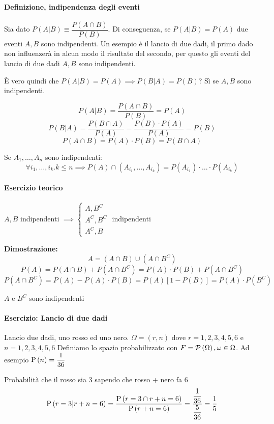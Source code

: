 \paragraph{Definizione, indipendenza degli eventi} 

Sia dato $ P(A|B) \equiv \dfrac{P(A \cap B)}{P(B)} $. Di conseguenza, se $ P(A|B) = P(A) $ due eventi $ A,B $ sono indipendenti. Un esempio è il lancio di due dadi, il primo dado non influenzerà in alcun modo il risultato del secondo, per questo gli eventi del lancio di due dadi $ A,B $ sono indipendenti.

È vero quindi che $ P(A|B) = P(A) \implies P(B|A) = P(B) $? Sì se $ A,B $ sono indipendenti.

\[ P(A|B) = \dfrac{P(A \cap B)}{P(B)} = P(A) \]
\[ P(B|A) = \dfrac{P(B \cap A)}{P(A)} = \dfrac{P(B) \cdot P(A)}{P(A)} = P(B)\]
\[ P(A \cap B)  = P(A) \cdot P(B) = P(B \cap A) \]

Se $ A_1, \dots, A_n $ sono indipendenti:
\[ \forall i_1, \dots, i_k . k \leq n  \implies P(A)\cap \left(A_{i_1},\dots,A_{i_k}\right) = P(A_{i_1}) \cdot \dots \cdot P(A_{i_k}) \] 

\paragraph{Esercizio teorico}

$ A, B $ indipendenti $ \implies \begin{cases}
A, B^C \\
A^C, B^C \\
A^C, B
\end{cases} $ indipendenti

\textbf{Dimostrazione:}
\[ A = (A \cap B) \cup (A \cap B^C)  \]
\[ P(A) = P(A \cap B) + P(A \cap B^C) = P(A) \cdot P(B) + P(A \cap B^C) \]
\[ P(A \cap B^C) = P(A) - P(A) \cdot P(B) = P(A)\left[1 - P(B)\right] = P(A) \cdot P(B^C) \]

$ A $ e $ B^C $ sono indipendenti \enddim

\paragraph{Esercizio: Lancio di due dadi}
Lancio due dadi, uno rosso ed uno nero.
$ \Omega = (r, n) $ dove $ r = 1,2,3,4,5,6 $ e $ n = 1,2,3,4,5,6 $ 
Definiamo lo spazio probabilizzato con $ F = \mathcal{P}\left(\Omega\right), \omega \in \Omega $. Ad esempio $ \text{P}\left(n\right) = \dfrac{1}{36} $

Probabilità che il rosso sia 3 sapendo che rosso + nero fa 6
\[ \text{P}\left(r=3 | r+n = 6\right) = \dfrac{\text{P}\left(r=3 \cap r + n = 6\right)}{\text{P}\left(r+n=6\right)} = \dfrac{\dfrac{1}{36}}{\dfrac{5}{36}} = \dfrac{1}{5}\] 

